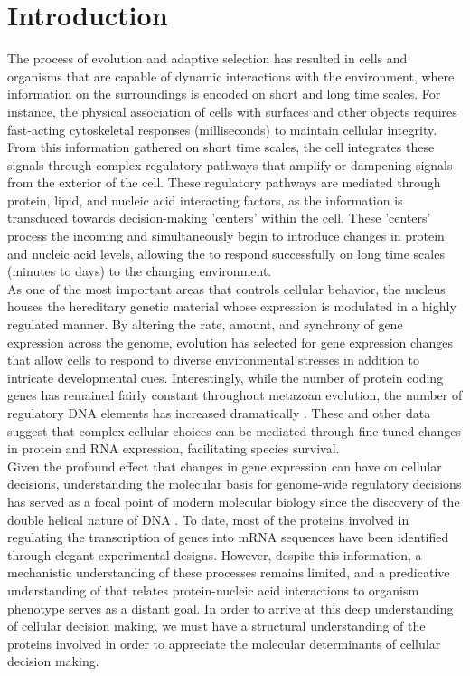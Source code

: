 \chapter{Introduction}

\indent The process of evolution and adaptive selection has resulted in cells and organisms that are capable of dynamic interactions with the environment, where information on the surroundings is encoded on short and long time scales. For instance, the physical association of cells with surfaces and other objects requires fast-acting cytoskeletal responses (milliseconds) to maintain cellular integrity. From this information gathered on short time scales, the cell integrates these signals through complex regulatory pathways that amplify or dampening signals from the exterior of the cell. These regulatory pathways are mediated through protein, lipid, and nucleic acid interacting factors, as the information is transduced towards decision-making 'centers' within the cell.  These 'centers' process the incoming and simultaneously begin to introduce changes in protein and nucleic acid levels, allowing the to respond successfully on long time scales (minutes to days) to the changing environment.\\
\indent As one of the most important areas that controls cellular behavior, the nucleus houses the hereditary genetic material whose expression is modulated in a highly regulated manner. By altering the rate, amount, and synchrony of gene expression across the genome, evolution has selected for gene expression changes that allow cells to respond to diverse environmental stresses in addition to intricate developmental cues. Interestingly, while the number of protein coding genes has remained fairly constant throughout metazoan evolution, the number of regulatory DNA elements has increased dramatically \cite{Levine_1710}. These and other data suggest that complex cellular choices can be mediated through fine-tuned changes in protein and RNA expression, facilitating species survival. \\
\indent Given the profound effect that changes in gene expression can have on cellular decisions, understanding the molecular basis for genome-wide regulatory decisions has served as a focal point of modern molecular biology since the discovery of the double helical nature of DNA \cite{Watson_4017}. To date, most of the proteins involved in regulating the transcription of genes into mRNA sequences have been identified through elegant experimental designs.  However, despite this information, a mechanistic understanding of these processes remains limited, and a predicative understanding of that relates protein-nucleic acid interactions to organism phenotype serves as a distant goal. In order to arrive at this deep understanding of cellular decision making, we must have a structural understanding of the proteins involved in order to appreciate the molecular determinants of cellular decision making. 

